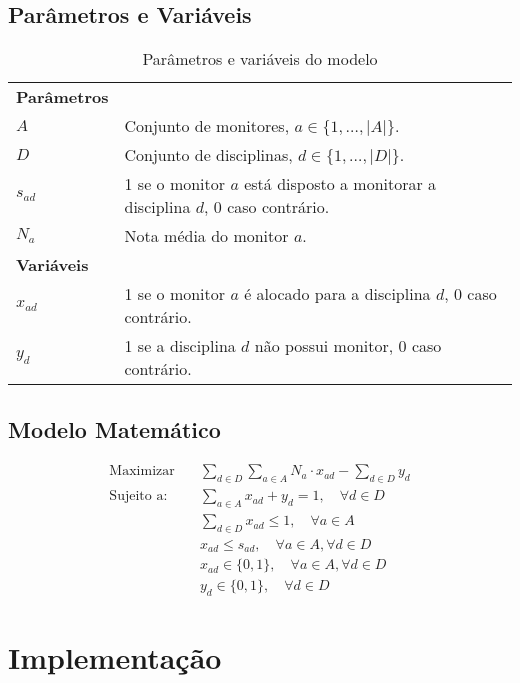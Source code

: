\documentclass[a4paper,12pt]{article}
\begin{document}
\subsection{Parâmetros e Variáveis}

\begin{table}[h!]
    \centering
    \caption{Parâmetros e variáveis do modelo}
    \begin{tabular}{l p{10cm}}
        \toprule
        \textbf{Parâmetros} & \\
        $A$ & Conjunto de monitores, $a \in \{1, \dots, |A|\}$. \\
        $D$ & Conjunto de disciplinas, $d \in \{1, \dots, |D|\}$. \\
        $s_{ad}$ & 1 se o monitor $a$ está disposto a monitorar a disciplina $d$, 0 caso contrário. \\
        $N_a$ & Nota média do monitor $a$. \\
        \midrule
        \textbf{Variáveis} & \\
        $x_{ad}$ & 1 se o monitor $a$ é alocado para a disciplina $d$, 0 caso contrário. \\
        $y_d$ & 1 se a disciplina $d$ não possui monitor, 0 caso contrário. \\
        \bottomrule
    \end{tabular}
\end{table}

\subsection{Modelo Matemático}

\begin{align}
    \text{Maximizar} \quad & \sum_{d \in D} \sum_{a \in A} N_a \cdot x_{ad} - \sum_{d \in D} y_d \\
    \text{Sujeito a:} \quad & \sum_{a \in A} x_{ad} + y_d = 1, \quad \forall d \in D \\
    & \sum_{d \in D} x_{ad} \leq 1, \quad \forall a \in A \\
    & x_{ad} \leq s_{ad}, \quad \forall a \in A, \forall d \in D \\
    & x_{ad} \in \{0,1\}, \quad \forall a \in A, \forall d \in D \\
    & y_d \in \{0,1\}, \quad \forall d \in D
\end{align}

\section{Implementação}
\end{document}
